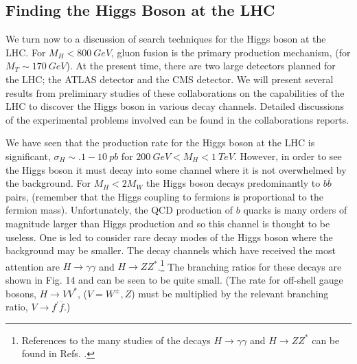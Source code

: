 \subsection{Finding the Higgs Boson at the LHC}

We turn now to a discussion of search techniques for the
Higgs boson at the LHC.  For $M_H< 800~GeV$, gluon
fusion is the primary production mechanism, (for $M_T\sim 170~GeV$).
  At the present time, there are two
large detectors planned for the LHC; the ATLAS detector\cite{atlas}
and the CMS detector\cite{cms}.  We will present several
results from preliminary studies of these collaborations on the capabilities
of the LHC to discover the Higgs boson in various decay channels.
Detailed discussions of the experimental problems involved can
be found in the collaborations reports.

We have seen that the production rate for the Higgs boson at the LHC
is significant, $\sigma_H\sim .1 - 10~pb$ for $200~GeV < M_H
< 1~TeV$.  However, in order to see the Higgs boson it must decay into
some channel where it is not overwhelmed by the background.
For $M_H < 2 M_W$ the Higgs boson decays predominantly to
$b {\overline b}$ pairs, (remember that the Higgs coupling to fermions
is proportional to the fermion mass).  Unfortunately, the QCD production
of $b$ quarks is many orders of magnitude larger than Higgs production
and so this channel is thought to be useless.\cite{agel}
  One is led to consider
rare decay modes of the Higgs boson where the background may be smaller.
The decay channels which have received the most attention
are $H\rightarrow \gamma\gamma$ and
$H\rightarrow Z Z^*$.\cite{gg}\footnote{References to the many
studies of  the decays
$H\rightarrow\gamma\gamma$ and $H\rightarrow Z Z^*$
can be found in Refs. \cite{atlas,cms}.}
The branching ratios for these decays are shown in Fig. 14 and can
be seen to be  quite small.  (The rate for
off-shell gauge bosons,
 $H\rightarrow V V^*$, ($V=W^\pm,Z$)
must be multiplied by the relevant
branching ratio, $V\rightarrow f^{\prime} {\overline f}$.)

